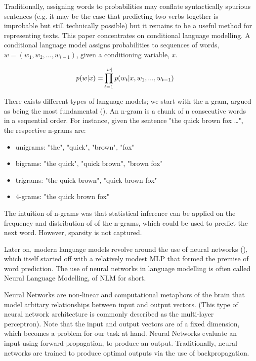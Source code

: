 \documentclass[12pt,twoside]{report}
\begin{document}
Traditionally, assigning words to probabilities may conflate syntactically spurious sentences (e.g. it may be the case that predicting two verbs together is improbable but still technically possible) but it remains to be a useful method for representing texts. This paper concentrates on conditional language modelling. A conditional language model assigns probabilities to sequences of words, $w = (w_1, w_2, ..., w_{i-1})$, given a conditioning variable, $x$. 

\begin{align}
	p(\boldmath{w}|x) = &{} \prod^{|w|}_{t=1}p(w_t|x,w_1, ..., w_{t-1})
\end{align}

There exists different types of language models; we start with the n-gram, argued as being the most fundamental (\cite{le_recurrent_2018}). An n-gram is a chunk of n consecutive words in a sequential order. For instance, given the sentence "the quick brown fox \ldots", the respective n-grams are: 

\begin{itemize}  
	\item unigrams: "the", "quick", "brown", "fox"
	\item bigrams: "the quick", "quick brown", "brown fox"
	\item trigrams: "the quick brown", "quick brown fox"
	\item 4-grams: "the quick brown fox"
\end{itemize}

The intuition of n-grams was that statistical inference can be applied on the frequency and distribution of of the n-grams, which could be used to predict the next word. However, sparsity is not captured.

Later on, modern language models revolve around the use of neural networks (\cite{bengio_neural_2001}), which itself started off with a relatively modest MLP that formed the premise of word prediction. The use of neural networks in language modelling is often called Neural Language Modelling, of NLM for short.

Neural Networks are non-linear and computational metaphors of the brain that model arbitary relationships between input and output vectors. (This type of neural network architecture is commonly described as the multi-layer perceptron). Note that the input and output vectors are of a fixed dimension, which becomes a problem for our task at hand. Neural Networks evaluate an input using forward propagation, to produce an output. Traditionally, neural networks are trained to produce optimal outputs via the use of backpropagation. 
\end{document}
